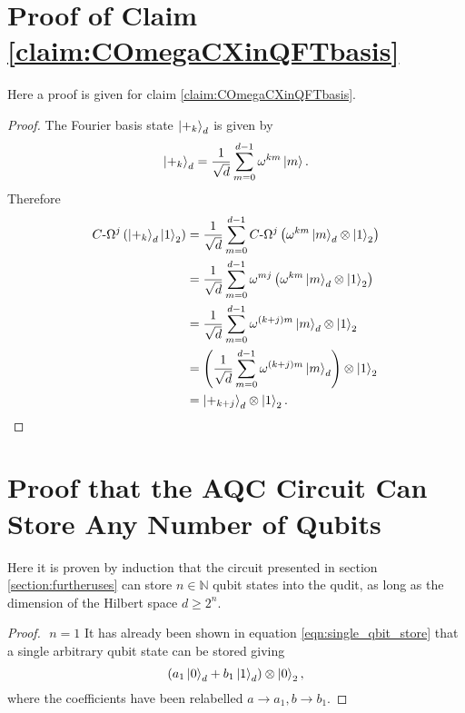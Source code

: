 \begin{appendices}
\newpage
\section{Proof of Claim \ref{claim:COmegaCXinQFTbasis}}
\label{appendix:c_omega}
\setcounter{equation}{0}
\renewcommand{\theequation}{C.\arabic{equation}}

Here a proof is given for claim \ref{claim:COmegaCXinQFTbasis}.

\begin{proof}
    The Fourier basis state $\ket{+_k}_d$ is given by
    \begin{equation}
        \ket{+_k}_d = \frac{1}{\sqrt{d}}\sum_{m=0}^{d-1}\omega^{km}\ket{m}.
    \end{equation}
    Therefore
    \begin{align}
        C\text{-}\Omega^j\left(\ket{+_k}_d\ket{1}_2\right) 
        &= \frac{1}{\sqrt{d}}\sum_{m=0}^{d-1}C\text{-}\Omega^j\left(\omega^{km}\ket{m}_d\otimes\ket{1}_2\right)\\
        &= \frac{1}{\sqrt{d}}\sum_{m=0}^{d-1}\omega^{mj}\left(\omega^{km}\ket{m}_d\otimes\ket{1}_2\right)\\
        &= \frac{1}{\sqrt{d}}\sum_{m=0}^{d-1}\omega^{(k+j)m}\ket{m}_d\otimes\ket{1}_2\\
        &= \left(\frac{1}{\sqrt{d}}\sum_{m=0}^{d-1}\omega^{(k+j)m}\ket{m}_d\right)\otimes\ket{1}_2\\
        &= \ket{+_{k+j}}_d\otimes\ket{1}_2.
    \end{align}
\end{proof}

\newpage
\section{Proof that the AQC Circuit Can Store Any Number of Qubits}
\setcounter{equation}{0}
\renewcommand{\theequation}{D.\arabic{equation}}
\label{appendix:any_num_qubits}
Here it is proven by induction that the circuit presented in section \ref{section:furtheruses} can store $n\in\mathbb{N}$ qubit states into the qudit, as long as the dimension of the Hilbert space $d\geq 2^n$.
\begin{proof}$ $\newline
    $n=1$\newline
    It has already been shown in equation \ref{eqn:single_qbit_store} that a single arbitrary qubit state can be stored giving
    \begin{equation}
        (a_1\ket{0}_d + b_1\ket{1}_d)\otimes\ket{0}_2,
    \end{equation}
    where the coefficients have been relabelled $a \rightarrow a_1, b\rightarrow b_1$.
    \newline


\end{proof}
\end{appendices}
